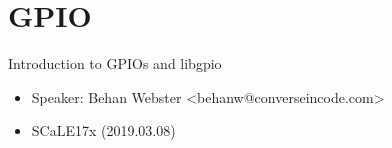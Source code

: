 \section{GPIO}

\begin{frame}
   {Introduction to GPIOs and libgpio}
   \begin{itemize}
      \item Speaker: Behan Webster \textless behanw@converseincode.com\textgreater
      \item SCaLE17x (2019.03.08)
   \end{itemize}
\end{frame}

\cprotect\note{

}

